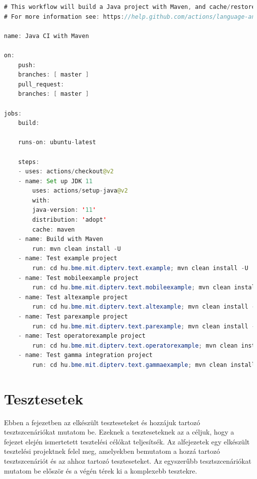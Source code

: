 \begin{lstlisting}[language=java, frame=single, float=ht!, caption={Github Actions CI-hoz tartozó .yml script.},captionpos=b,label=ci_script]
# This workflow will build a Java project with Maven, and cache/restore any dependencies to improve the workflow execution time
# For more information see: https://help.github.com/actions/language-and-framework-guides/building-and-testing-java-with-maven

name: Java CI with Maven

on:
    push:
    branches: [ master ]
    pull_request:
    branches: [ master ]

jobs:
    build:

    runs-on: ubuntu-latest

    steps:
    - uses: actions/checkout@v2
    - name: Set up JDK 11
        uses: actions/setup-java@v2
        with:
        java-version: '11'
        distribution: 'adopt'
        cache: maven
    - name: Build with Maven
        run: mvn clean install -U
    - name: Test example project
        run: cd hu.bme.mit.dipterv.text.example; mvn clean install -U
    - name: Test mobileexample project
        run: cd hu.bme.mit.dipterv.text.mobileexample; mvn clean install -U
    - name: Test altexample project
        run: cd hu.bme.mit.dipterv.text.altexample; mvn clean install -U
    - name: Test parexample project
        run: cd hu.bme.mit.dipterv.text.parexample; mvn clean install -U
    - name: Test operatorexample project
        run: cd hu.bme.mit.dipterv.text.operatorexample; mvn clean install -U
    - name: Test gamma integration project
        run: cd hu.bme.mit.dipterv.text.gammaexample; mvn clean install -U
\end{lstlisting}

\clearpage\section{Tesztesetek}

Ebben a fejezetben az elkészült teszteseteket és hozzájuk tartozó tesztszcenáriókat mutatom be.
Ezeknek a teszteseteknek az a céljuk, hogy a fejezet elején ismertetett tesztelési célókat teljesítsék.
Az alfejezetek egy elkészült tesztelési projektnek felel meg, amelyekben bemutatom a hozzá tartozó tesztszcenáriót és az ahhoz tartozó teszteseteket.
Az egyszerűbb tesztszcenáriókat mutatom be először és a végén térek ki a komplexebb tesztekre.

